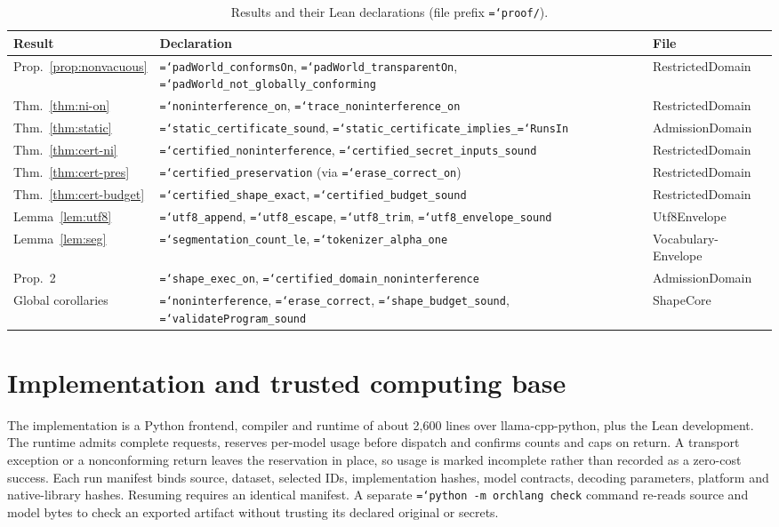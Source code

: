 \documentclass[preprint,12pt]{elsarticle}
\theoremstyle{definition}
\newcommand{\code}[1]{\texttt{\hyphenchar\font=`\-#1}}
\begin{document}
\begin{table}[t]
\centering\footnotesize
\caption{Results and their Lean declarations (file prefix \code{proof/}).}
\label{tab:lean}
\begin{tabular}{>{\raggedright\arraybackslash}p{19mm}>{\raggedright\arraybackslash}p{75mm}>{\raggedright\arraybackslash}p{28mm}}\toprule
Result & Declaration & File\\\midrule
Prop.~\ref{prop:nonvacuous} & \code{padWorld\_conformsOn}, \code{padWorld\_transparentOn}, \code{padWorld\_not\_globally\_conforming} & RestrictedDomain\\
Thm.~\ref{thm:ni-on} & \code{noninterference\_on}, \code{trace\_noninterference\_on} & RestrictedDomain\\
Thm.~\ref{thm:static} & \code{static\_certificate\_sound}, \code{static\_certificate\_implies\_}\allowbreak\code{RunsIn} & AdmissionDomain\\
Thm.~\ref{thm:cert-ni} & \code{certified\_noninterference}, \code{certified\_secret\_inputs\_sound} & RestrictedDomain\\
Thm.~\ref{thm:cert-pres} & \code{certified\_preservation} (via \code{erase\_correct\_on}) & RestrictedDomain\\
Thm.~\ref{thm:cert-budget} & \code{certified\_shape\_exact}, \code{certified\_budget\_sound} & RestrictedDomain\\
Lemma~\ref{lem:utf8} & \code{utf8\_append}, \code{utf8\_escape}, \code{utf8\_trim}, \code{utf8\_envelope\_sound} & Utf8Envelope\\
Lemma~\ref{lem:seg} & \code{segmentation\_count\_le}, \code{tokenizer\_alpha\_one} & Vocabulary-Envelope\\
Prop.~2 & \code{shape\_exec\_on}, \code{certified\_domain\_noninterference} & AdmissionDomain\\
Global corollaries & \code{noninterference}, \code{erase\_correct}, \code{shape\_budget\_sound}, \code{validateProgram\_sound} & ShapeCore\\\bottomrule
\end{tabular}
\end{table}

\section{Implementation and trusted computing base}\label{sec:impl}

The implementation is a Python frontend, compiler and runtime of about 2,600 lines
over llama-cpp-python, plus the Lean development. The runtime admits complete
requests, reserves per-model usage before dispatch and confirms counts and caps on
return. A transport exception or a nonconforming return leaves the reservation in
place, so usage is marked incomplete rather than recorded as a zero-cost success.
Each run manifest binds source, dataset, selected IDs, implementation hashes,
model contracts, decoding parameters, platform and native-library hashes. Resuming
requires an identical manifest. A separate \code{python -m orchlang check} command
re-reads source and model bytes to check an exported artifact without trusting its
declared original or secrets.
\end{document}
